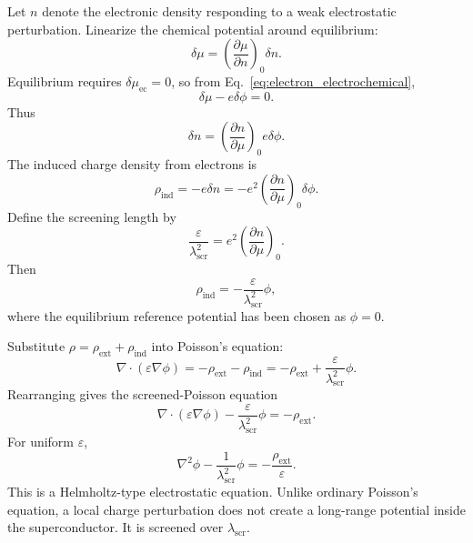 \documentclass[11pt]{article}
\newcommand{\rhoext}{\rho_{\mathrm{ext}}}
\newcommand{\rhoind}{\rho_{\mathrm{ind}}}
\newcommand{\lams}{\lambda_{\mathrm{scr}}}
\newcommand{\muchem}{\mu}
\newcommand{\muec}{\mu_{\mathrm{ec}}}
\begin{document}
Let $n$ denote the electronic density responding to a weak electrostatic perturbation. Linearize the chemical potential around equilibrium:
\begin{equation}
\delta \muchem = \left(\frac{\partial \muchem}{\partial n}\right)_0 \delta n.
\end{equation}
Equilibrium requires $\delta\muec=0$, so from Eq.~\eqref{eq:electron_electrochemical},
\begin{equation}
\delta\muchem - e\delta\phi = 0.
\end{equation}
Thus
\begin{equation}
\delta n = \left(\frac{\partial n}{\partial \muchem}\right)_0 e\delta\phi.
\end{equation}
The induced charge density from electrons is
\begin{equation}
\rhoind = -e\delta n
= -e^2\left(\frac{\partial n}{\partial \muchem}\right)_0\delta\phi.
\end{equation}
Define the screening length by
\begin{equation}
\frac{\varepsilon}{\lams^2}
= e^2\left(\frac{\partial n}{\partial \muchem}\right)_0.
\label{eq:screening_length_definition}
\end{equation}
Then
\begin{equation}
\rhoind = -\frac{\varepsilon}{\lams^2}\phi,
\label{eq:induced_charge_linear}
\end{equation}
where the equilibrium reference potential has been chosen as $\phi=0$.

Substitute $\rho=\rhoext+\rhoind$ into Poisson's equation:
\begin{equation}
\nabla\cdot(\varepsilon\nabla\phi)
= -\rhoext - \rhoind
= -\rhoext + \frac{\varepsilon}{\lams^2}\phi.
\end{equation}
Rearranging gives the screened-Poisson equation
\begin{equation}
\boxed{\nabla\cdot(\varepsilon\nabla\phi) - \frac{\varepsilon}{\lams^2}\phi = -\rhoext.}
\label{eq:screened_poisson}
\end{equation}
For uniform $\varepsilon$,
\begin{equation}
\boxed{\nabla^2\phi - \frac{1}{\lams^2}\phi = -\frac{\rhoext}{\varepsilon}.}
\label{eq:screened_poisson_uniform}
\end{equation}
This is a Helmholtz-type electrostatic equation. Unlike ordinary Poisson's equation, a local charge perturbation does not create a long-range potential inside the superconductor. It is screened over $\lams$.
\end{document}
